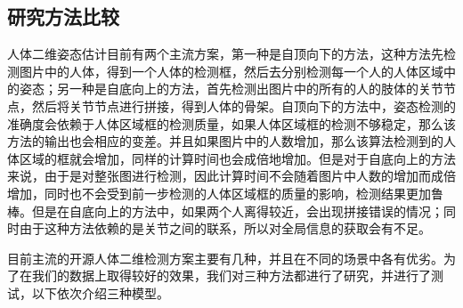 \subsection{研究方法比较}
人体二维姿态估计目前有两个主流方案，第一种是自顶向下的方法，这种方法先检测图片中的人体，得到一个人体的检测框，然后去分别检测每一个人的人体区域中的姿态；另一种是自底向上的方法，首先检测出图片中的所有的人的肢体的关节节点，然后将关节节点进行拼接，得到人体的骨架。自顶向下的方法中，姿态检测的准确度会依赖于人体区域框的检测质量，如果人体区域框的检测不够稳定，那么该方法的输出也会相应的变差。并且如果图片中的人数增加，那么该算法检测到的人体区域的框就会增加，同样的计算时间也会成倍地增加。但是对于自底向上的方法来说，由于是对整张图进行检测，因此计算时间不会随着图片中人数的增加而成倍增加，同时也不会受到前一步检测的人体区域框的质量的影响，检测结果更加鲁棒。但是在自底向上的方法中，如果两个人离得较近，会出现拼接错误的情况；同时由于这种方法依赖的是关节之间的联系，所以对全局信息的获取会有不足。

目前主流的开源人体二维检测方案主要有几种，并且在不同的场景中各有优劣。为了在我们的数据上取得较好的效果，我们对三种方法都进行了研究，并进行了测试，以下依次介绍三种模型。

